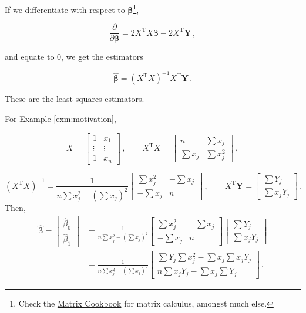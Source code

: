 \documentclass[
]{book}
\theoremstyle{definition}
\theoremstyle{definition}
\theoremstyle{definition}
\theoremstyle{definition}
\theoremstyle{remark}
\begin{document}
If we differentiate with respect to \(\boldsymbol{\beta}\)\footnote{Check the \href{https://www.math.uwaterloo.ca/~hwolkowi/matrixcookbook.pdf}{Matrix Cookbook} for matrix calculus, amongst much else.},

\begin{equation*}
\frac{\partial}{\partial\boldsymbol{\beta}}=2X^{\textrm{T}}X\boldsymbol{\beta}-2X^{\textrm{T}}\boldsymbol{Y}\,,\nonumber
\end{equation*}

and equate to 0, we get the estimators

\begin{equation}
\hat{\boldsymbol{\beta}}=(X^{\textrm{T}}X)^{-1}X^{\textrm{T}}\boldsymbol{Y}\,.
\label{eq:lsestimators}
\end{equation}

These are the least squares estimators.

For Example \ref{exm:motivation},

\[
X=\left[\begin{array}{cc}
1&x_{1}\\
\vdots&\vdots\\
1&x_{n}\end{array}\right]\,,
\qquad
X^{\textrm{T}}X=\left[\begin{array}{cc}
n&\sum x_j\\
\sum x_j&\sum x_j^{2}\end{array}\right]\,,
\]

\[
(X^{\textrm{T}}X)^{-1}=\frac{1}{n\sum x_j^{2}-(\sum x_j)^{2}}\left[\begin{array}{cc}
\sum x_j^{2}&-\sum x_j\\
-\sum x_j&n\end{array}\right]\,,
\qquad
X^{\textrm{T}}\boldsymbol{Y}=\left[\begin{array}{c}
\sum Y_j\\
\sum x_jY_j\end{array}\right]\,.
\]
Then,
\begin{align}
\hat{\boldsymbol{\beta}}=\left[\begin{array}{c}
\hat{\beta}_{0}\\
\hat{\beta}_{1}\end{array}\right]
& =\frac{1}{n\sum x_j^{2}-(\sum x_j)^{2}}
\left[\begin{array}{cc}
\sum x_j^{2}&-\sum x_j\\
-\sum x_j&n\end{array}\right]
\left[\begin{array}{c}
\sum Y_j\\
\sum x_jY_j\end{array}\right]\nonumber \\
&= \frac{1}{n\sum x_j^{2}-(\sum x_j)^{2}}\left[\begin{array}{c}
\sum Y_j\sum x_j^{2}-\sum x_j\sum x_jY_j\\
n\sum x_jY_j-\sum x_j\sum Y_j\end{array}\right]\,.
\end{align}
\end{document}
